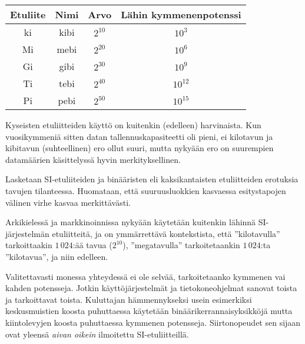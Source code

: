 \begin{center}
\begin{tabular}{c|c|c|c}
Etuliite & Nimi & Arvo & Lähin kymmenenpotenssi \\
\hline
ki & kibi & $2^{10}$ & $10^3$	\\
Mi & mebi & $2^{20}$ & $10^6$\\
Gi & gibi & $2^{30}$ & $10^9$\\
Ti & tebi & $2^{40}$ & $10^{12}$ \\
Pi & pebi & $2^{50}$ & $10^{15}$\\
\end{tabular}
\end{center}

Kyseisten etuliitteiden käyttö on kuitenkin (edelleen) harvinaista. Kun vuosikymmeniä sitten datan tallennuskapasiteetti oli pieni, ei kilotavun ja kibitavun (suhteellinen) ero ollut suuri, mutta nykyään ero on suurempien datamäärien käsittelyssä hyvin merkityksellinen. 

\begin{esimerkki}
Lasketaan SI-etuliiteiden ja binääristen eli kaksikantaisten etuliitteiden erotuksia tavujen tilanteessa.
Huomataan, että suuruusluokkien kasvaessa esitystapojen välinen virhe kasvaa merkittävästi.
\end{esimerkki}

Arkikielessä ja markkinoinnissa nykyään käytetään kuitenkin lähinnä SI-järjestelmän etuliitteitä, ja on ymmärrettävä kontekstista, että ''kilotavulla'' tarkoittaakin $1\,024$:ää tavua ($2^{10}$), ''megatavulla'' tarkoitetaankin $1\,024$:ta ''kilotavua'', ja niin edelleen.

Valitettavasti monessa yhteydessä ei ole selvää, tarkoitetaanko kymmenen vai kahden potensseja. Jotkin käyttöjärjestelmät ja tietokoneohjelmat sanovat toista ja tarkoittavat toista. Kuluttajan hämmennykseksi usein esimerkiksi keskusmuistien koosta puhuttaessa käytetään binäärikerrannaisyksikköjä mutta kiintolevyjen koosta puhuttaessa kymmenen potensseja. Siirtonopeudet sen sijaan ovat yleensä \textit{aivan oikein} ilmoitettu SI-etuliitteillä.

